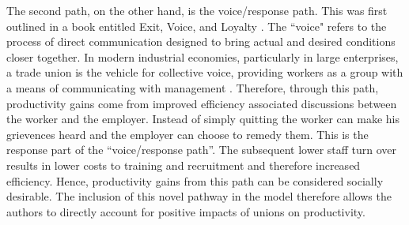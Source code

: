 \documentclass[11pt]{article}
\begin{document}
\begin{spacing}{1.7}
	The second path, on the other hand, is the voice/response path. This was first outlined in a book entitled Exit, Voice, and Loyalty \parencite{hirschman1972exit}.  The ``voice" refers to the process of direct
	communication designed to bring actual and desired conditions closer together. In modern industrial economies, particularly in large enterprises, a trade union is the vehicle for collective voice, providing workers as a group with a means of communicating with management \parencite{freeman1979two}. Therefore, through this path, productivity gains  come from improved efficiency associated discussions between the worker and the employer. Instead of simply quitting the worker can make his grievences heard and the employer can choose to remedy them. This is the response part of the ``voice/response path''. The subsequent lower staff turn over results in lower costs to training and recruitment and therefore increased efficiency. Hence, productivity gains from this path can be considered socially desirable. The inclusion of this novel pathway in the model therefore allows the authors to directly account for positive impacts of unions on productivity.
	 
	

\end{spacing}
\end{document}

